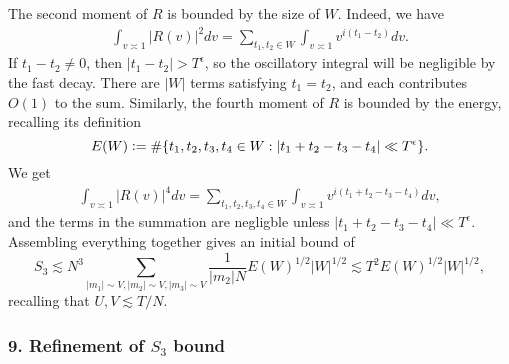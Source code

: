The second moment of $R$ is bounded by the size of $W$. Indeed, we have \begin{align*}
    \int_{v\asymp 1} |R(v)|^2 dv =  \sum_{t_1,t_2\in W} \int_{v\asymp 1} v^{i(t_1-t_2)} dv.  
\end{align*}
If $t_1-t_2\neq 0$, then $|t_1-t_2|>T^\epsilon$, so the oscillatory integral will be negligible by the fast decay. There are $|W|$ terms satisfying $t_1=t_2$, and each contributes $O(1)$ to the sum. Similarly, the fourth moment of $R$ is bounded by the energy, recalling its definition \[
    E(W)\mathrel{\mathop:}= \#\{t_1,t_2,t_3,t_4\in W : |t_1+t_2-t_3-t_4|\ll T^\epsilon\}.
\]
We get
\begin{align*}
    \int_{v\asymp 1} |R(v)|^4 dv =   \sum_{t_1,t_2,t_3,t_4\in W} \int_{v\asymp 1}  v^{i(t_1+t_2-t_3-t_4)} dv, 
\end{align*}
and the terms in the summation are negligble unless $|t_1+t_2-t_3-t_4|\ll T^\epsilon$. Assembling everything together gives an initial bound of \[
S_3\lesssim N^3\sum_{|m_1|\sim V ,|m_2|\sim V, |m_3|\sim V}\frac{1}{|m_2|N}E(W)^{1/2}|W|^{1/2}\lesssim T^2E(W)^{1/2}|W|^{1/2},
\]
recalling that $U,V\lesssim T/N$.


\subsubsection*{9. Refinement of $S_3$ bound}

